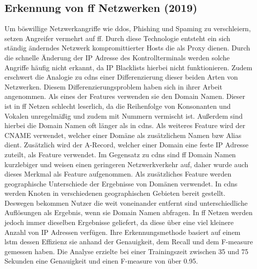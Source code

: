 \documentclass[
    12pt, %
    DIV10,
    ngerman, %
    a4paper, %
    oneside, %
    titlepage, %
    parskip=half, %
    headings=normal, %
    listof=totoc, %
    bibliography=totoc, %
    index=totoc, %
    captions=tableheading, %
    final %
]{scrreprt}
\begin{document}
\subsection{Erkennung von \acs{ff} Netzwerken (2019)}
Um böswillige Netzwerkangriffe wie \ac{ddos}, Phishing und Spaming zu verschleiern, setzen Angreifer vermehrt auf \ac{ff}. Durch diese Technologie entsteht ein sich ständig änderndes Netzwerk kompromittierter Hosts die als Proxy dienen. Durch die schnelle Änderung der IP Adresse des Kontrollterminals werden solche Angriffe häufig nicht erkannt, da IP Blacklists hierbei nicht funktionieren. Zudem erschwert die Analogie zu \ac{cdns} einer Differenzierung dieser beiden Arten von Netzwerken.
Diesem Differenzierungsproblem haben sich \textcite{Chen2019} in ihrer Arbeit angenommen. Als eines der Features verwenden sie den Domain Namen. Dieser ist in \ac{ff} Netzen schlecht leserlich, da die Reihenfolge von Konsonanten und Vokalen unregelmäßig und zudem mit Nummern vermischt ist. Außerdem sind hierbei die Domain Namen oft länger als in \ac{cdns}. Als weiteres Feature wird der CNAME verwendet, welcher einer Domäne als zusätzlichem Namen bzw Alias dient. Zusätzlich wird der A-Record, welcher einer Domain eine feste IP Adresse zuteilt, als Feature verwendet. Im Gegensatz zu \ac{cdns} sind \ac{ff} Domain Namen kurzlebiger und weisen einen geringeren Netzwerkverkehr auf, daher wurde auch dieses Merkmal als Feature aufgenommen. Als zusätzliches Feature werden geographische Unterschiede der Ergebnisse von Domänen verwendet. In \ac{cdns} werden Knoten in verschiedenen geographischen Gebieten bereit gestellt. Deswegen bekommen Nutzer die weit voneinander entfernt sind unterschiedliche Auflösungen als Ergebnis, wenn sie Domain Namen abfragen. In \ac{ff} Netzen werden jedoch immer dieselben Ergebnisse geliefert, da diese über eine viel kleinere Anzahl von IP Adressen verfügen. Ihre Erkennungsmethode basiert auf einem \ac{lstm} dessen Effizienz sie anhand der Genauigkeit, dem Recall und dem F-measure gemessen haben. Die Analyse erzielte bei einer Trainingszeit zwischen 35 und 75 Sekunden eine Genauigkeit und einen F-measure von über 0.95.
%
\end{document}
